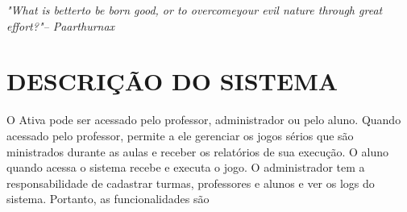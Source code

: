 \documentclass{utfpr-pg}
\let\oldlstlistoflistings\lstlistoflistings
\renewcommand{\lstlistoflistings}{%
  \begingroup%
  \let\oldnumberline\numberline%
  \renewcommand{\numberline}{\lstlistingname~\oldnumberline}%
  \oldlstlistoflistings*%
  \endgroup}
\renewcommand{\lstlistingname}{Código}
\begin{document}
\frenchspacing





\imprimircapa
\imprimirfolhaderosto

\cleardoublepage

% 



\begin{epigrafe}
    \vspace*{\fill}
	\begin{flushright}
		\textit{"What is better\smallbreak to be born good, or to overcome\smallbreak  your evil nature through great effort?"\smallbreak -- Paarthurnax}
	\end{flushright}
\end{epigrafe}



\listoffigures
\cleardoublepage







\tableofcontents*
\cleardoublepage

\textual
  \pagestyle{simple}

\chapter{DESCRIÇÃO DO SISTEMA}
  \label{chapter:descsistema}
  O Ativa pode ser acessado pelo professor, administrador ou pelo aluno. Quando acessado pelo professor, permite a ele gerenciar os jogos sérios que são ministrados durante as aulas e receber os relatórios de sua execução. O aluno quando acessa o sistema recebe e executa o jogo. O administrador tem a responsabilidade de cadastrar turmas, professores e alunos e ver os logs do sistema. Portanto, as funcionalidades são \cite{simone2020}
  
  
\end{document}
